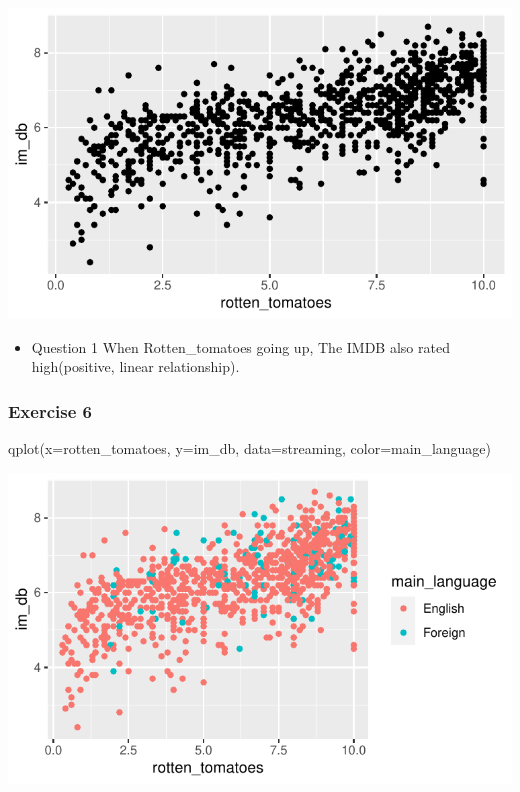 \documentclass[
  11pt,
]{article}
\newenvironment{Shaded}{\begin{snugshade}}{\end{snugshade}}
\newcommand{\AttributeTok}[1]{\textcolor[rgb]{0.77,0.63,0.00}{#1}}
\newcommand{\FunctionTok}[1]{\textcolor[rgb]{0.00,0.00,0.00}{#1}}
\newcommand{\NormalTok}[1]{#1}
\providecommand{\tightlist}{%
  \setlength{\itemsep}{0pt}\setlength{\parskip}{0pt}}
\begin{document}
\begin{center}\includegraphics[width=0.8\linewidth]{lab02_files/figure-latex/unnamed-chunk-4-1} \end{center}

\begin{itemize}
\tightlist
\item
  Question 1 When Rotten\_tomatoes going up, The IMDB also rated
  high(positive, linear relationship).
\end{itemize}

\hypertarget{exercise-6}{%
\subsubsection{Exercise 6}\label{exercise-6}}

\begin{Shaded}
\begin{Highlighting}[]
\FunctionTok{qplot}\NormalTok{(}\AttributeTok{x=}\NormalTok{rotten\_tomatoes, }\AttributeTok{y=}\NormalTok{im\_db, }\AttributeTok{data=}\NormalTok{streaming, }\AttributeTok{color=}\NormalTok{main\_language)}
\end{Highlighting}
\end{Shaded}

\begin{center}\includegraphics[width=0.8\linewidth]{lab02_files/figure-latex/unnamed-chunk-5-1} \end{center}
\end{document}
